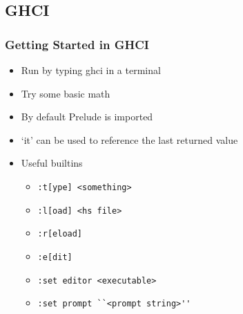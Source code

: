 \subsection{GHCI}
\begin{frame}[t,fragile]
    \frametitle{Getting Started in GHCI}
    \begin{itemize}[<+->]
        \item Run by typing ghci in a terminal
        \item Try some basic math
        \item By default Prelude is imported
        \item `it' can be used to reference the last returned value
        \item Useful builtins
            \begin{itemize}
                \item \begin{verbatim}:t[ype] <something>\end{verbatim}

                \item \begin{verbatim}:l[oad] <hs file>\end{verbatim}

                \item \begin{verbatim}:r[eload]\end{verbatim}

                \item \begin{verbatim}:e[dit]\end{verbatim}

                \item \begin{verbatim}:set editor <executable>\end{verbatim}

                \item \begin{verbatim}:set prompt ``<prompt string>''\end{verbatim}


\end{itemize}
\end{itemize}
\end{frame}
